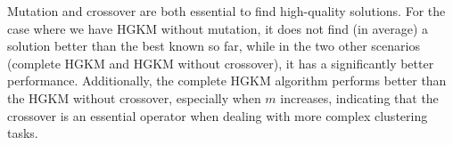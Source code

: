 \small{}

Mutation and crossover are both essential to find high-quality solutions. For the case where we have HGKM without mutation, it does not find (in average) a solution better than the best known so far, while in the two other scenarios (complete HGKM and HGKM without crossover), it has a significantly better performance. Additionally, the complete HGKM algorithm performs better than the HGKM without crossover, especially when $m$ increases, indicating that the crossover is an essential operator when dealing with more complex clustering tasks.

